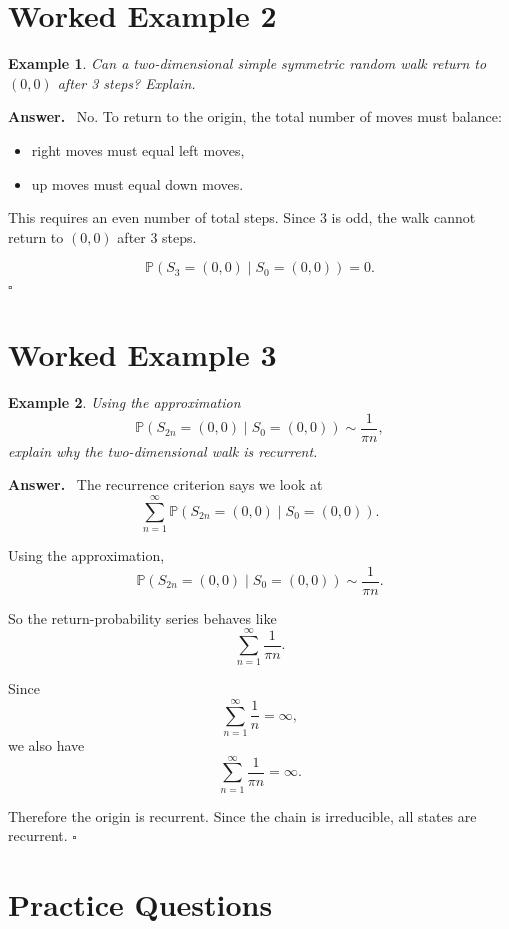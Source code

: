 \documentclass[12pt,a4paper]{article}
\theoremstyle{notestyle}
\newtheorem{example}{Example}
\newenvironment{answer}
{\par\textbf{Answer.}\ }
{\hfill$\square$\par}
\newcommand{\Prob}{\mathbb{P}}
\begin{document}
\section{Worked Example 2}

\begin{example}
Can a two-dimensional simple symmetric random walk return to $(0,0)$ after 3 steps? Explain.
\end{example}

\begin{answer}
No. To return to the origin, the total number of moves must balance:
\begin{itemize}[leftmargin=1.2cm]
    \item right moves must equal left moves,
    \item up moves must equal down moves.
\end{itemize}

This requires an even number of total steps. Since 3 is odd, the walk cannot return to $(0,0)$ after 3 steps.

\[
\boxed{\Prob(S_3=(0,0)\mid S_0=(0,0))=0.}
\]
\end{answer}

\section{Worked Example 3}

\begin{example}
Using the approximation
\[
\Prob(S_{2n}=(0,0)\mid S_0=(0,0))\sim \frac1{\pi n},
\]
explain why the two-dimensional walk is recurrent.
\end{example}

\begin{answer}
The recurrence criterion says we look at
\[
\sum_{n=1}^{\infty}\Prob(S_{2n}=(0,0)\mid S_0=(0,0)).
\]

Using the approximation,
\[
\Prob(S_{2n}=(0,0)\mid S_0=(0,0))\sim \frac1{\pi n}.
\]

So the return-probability series behaves like
\[
\sum_{n=1}^{\infty}\frac1{\pi n}.
\]

Since
\[
\sum_{n=1}^{\infty}\frac1n=\infty,
\]
we also have
\[
\sum_{n=1}^{\infty}\frac1{\pi n}=\infty.
\]

Therefore the origin is recurrent. Since the chain is irreducible, all states are recurrent.
\end{answer}

\section{Practice Questions}
\end{document}
